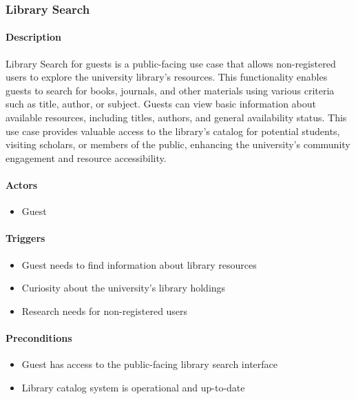 \subsubsection{Library Search}

\paragraph{Description}
Library Search for guests is a public-facing use case that allows non-registered users to explore the university library's resources. This functionality enables guests to search for books, journals, and other materials using various criteria such as title, author, or subject. Guests can view basic information about available resources, including titles, authors, and general availability status. This use case provides valuable access to the library's catalog for potential students, visiting scholars, or members of the public, enhancing the university's community engagement and resource accessibility.

\paragraph{Actors}
\begin{itemize}
    \item Guest
\end{itemize}

\paragraph{Triggers}
\begin{itemize}
    \item Guest needs to find information about library resources
    \item Curiosity about the university's library holdings
    \item Research needs for non-registered users
\end{itemize}

\paragraph{Preconditions}
\begin{itemize}
    \item Guest has access to the public-facing library search interface
    \item Library catalog system is operational and up-to-date
\end{itemize}

